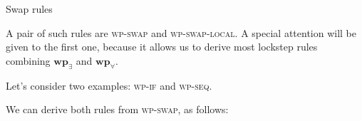 \begin{mathfig}{\small}
    \begin{proofrules}        
        

        
    \end{proofrules}
    \caption{Swap rules}
\end{mathfig}

A pair of such rules are \textsc{wp-swap} and \textsc{wp-swap-local}. A special attention will be given to the first one, because it allows us to derive most lockstep rules combining $\mathbf{wp}_{\exists}$ and $\mathbf{wp}_{\forall}$.

Let's consider two examples: \textsc{wp-if} and \textsc{wp-seq}.

\resizebox{0.8\width}{!}{
\begin{proofrules}
    

    
\end{proofrules}
}

\bigskip

We can derive both rules from \textsc{wp-swap}, as follows:

\bigskip

\begin{prooftree}
\end{prooftree}

\bigskip

